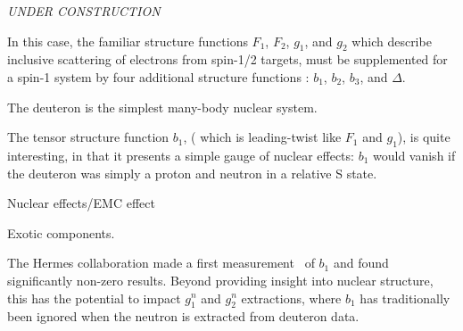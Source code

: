 {\it UNDER CONSTRUCTION}

In this case, the familiar structure functions  $F_1$, $F_2$, $g_1$, and $g_2$ which describe 
inclusive scattering of electrons from spin-1/2 targets, must be supplemented for a spin-1 system 
by four additional structure functions : $b_1$, $b_2$, $b_3$, and $\Delta$.

The deuteron is the simplest many-body nuclear system.

The tensor structure function $b_1$, ( which is leading-twist like  $F_1$ and $g_1$), is quite 
interesting, in that it presents a simple gauge of nuclear effects: $b_1$ would vanish if the 
deuteron was simply a proton and neutron in a relative S state.

Nuclear effects/EMC effect

Exotic components.

The Hermes collaboration  made a first measurement~\cite{Airapetian:2005cb} of 
$b_1$ and found significantly non-zero results.
Beyond providing insight into nuclear structure, this has the potential to impact $g_1^n$ and 
$g_2^n$ extractions, where $b_1$ has traditionally been ignored when the neutron is extracted 
from deuteron data.
